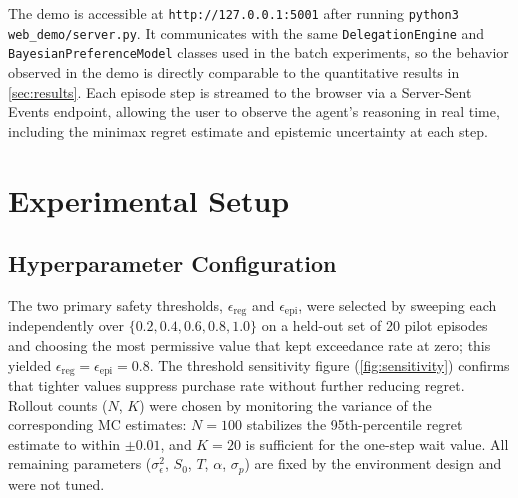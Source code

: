 \documentclass[11pt,letterpaper]{article}
\newcommand{\epsreg}{\epsilon_{\mathrm{reg}}}
\newcommand{\epsepi}{\epsilon_{\mathrm{epi}}}
\begin{document}
The demo is accessible at \texttt{http://127.0.0.1:5001} after running \texttt{python3 web\_demo/server.py}.  It communicates with the same \texttt{DelegationEngine} and \texttt{BayesianPreferenceModel} classes used in the batch experiments, so the behavior observed in the demo is directly comparable to the quantitative results in \cref{sec:results}.  Each episode step is streamed to the browser via a Server-Sent Events endpoint, allowing the user to observe the agent's reasoning in real time, including the minimax regret estimate and epistemic uncertainty at each step.

\section{Experimental Setup}
\label{sec:setup}

\subsection{Hyperparameter Configuration}

The two primary safety thresholds, $\epsreg$ and $\epsepi$, were selected by sweeping each independently over $\{0.2, 0.4, 0.6, 0.8, 1.0\}$ on a held-out set of 20 pilot episodes and choosing the most permissive value that kept exceedance rate at zero; this yielded $\epsreg = \epsepi = 0.8$.  The threshold sensitivity figure (\cref{fig:sensitivity}) confirms that tighter values suppress purchase rate without further reducing regret.  Rollout counts ($N$, $K$) were chosen by monitoring the variance of the corresponding MC estimates: $N = 100$ stabilizes the 95th-percentile regret estimate to within $\pm 0.01$, and $K = 20$ is sufficient for the one-step wait value.  All remaining parameters ($\sigma_\epsilon^2$, $S_0$, $T$, $\alpha$, $\sigma_p$) are fixed by the environment design and were not tuned.
\end{document}
